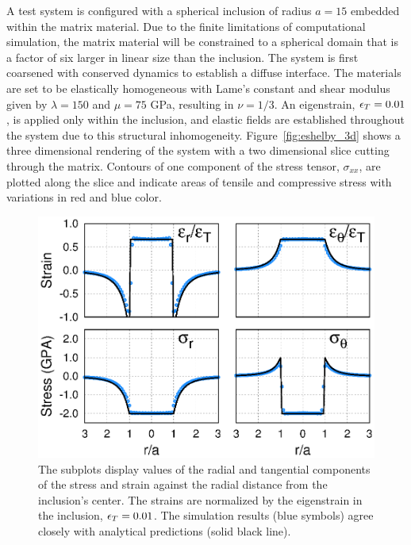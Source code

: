 A test system is configured with a spherical inclusion of radius $a=15$ embedded within the matrix material. Due to the finite limitations of computational simulation, the matrix material will be constrained to a spherical domain that is a factor of six larger in linear size than the inclusion. The system is first coarsened with conserved dynamics to establish a diffuse interface. The materials are set to be elastically homogeneous with Lame's constant and shear modulus given by $\lambda = 150$ and $\mu = 75$ GPa, resulting in $\nu = 1/3$. An eigenstrain, $\epsilon_T=0.01$, is applied only within the inclusion, and elastic fields are established throughout the system due to this structural inhomogeneity. Figure~\ref{fig:eshelby_3d} shows a three dimensional rendering of the system with a two dimensional slice cutting through the matrix. Contours of one component of the stress tensor, $\sigma_{xx}$, are plotted along the slice and indicate areas of tensile and compressive stress with variations in red and blue color.  

\begin{figure}[h!]
	\begin{center}
	\includegraphics{ch-fracture/eshelby/stress_strain}
	\caption{The subplots display values of the radial and tangential components of the stress and strain against the radial distance from the inclusion's center. The strains are normalized by the eigenstrain in the inclusion, $\epsilon_T=0.01$. The simulation results (blue symbols) agree closely with analytical predictions (solid black line).}  
	\label{fig:eshelby_results}
	\end{center}
\end{figure}


